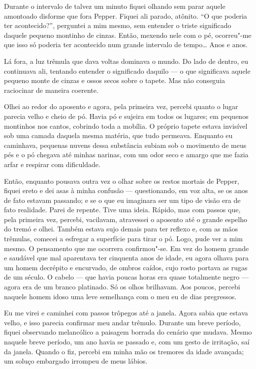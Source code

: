 Durante o intervalo de talvez um minuto fiquei olhando sem parar aquele amontoado disforme que fora Pepper. Fiquei ali
parado, atônito. ``O que poderia ter acontecido?'', perguntei a mim mesmo, sem entender o triste significado daquele
pequeno montinho de cinzas. Então, mexendo nele com o pé, ocorreu"-me que isso só poderia ter acontecido num grande
intervalo de tempo\ldots{} Anos e anos. 

Lá fora, a luz trêmula que dava voltas dominava o mundo. Do lado de dentro, eu continuava ali, tentando entender o
significado daquilo --- o que significava aquele pequeno monte de cinzas e ossos secos sobre o tapete. Mas não conseguia
raciocinar de maneira coerente.

Olhei ao redor do aposento e agora, pela primeira vez, percebi quanto o lugar parecia velho e cheio de pó. Havia pó e
sujeira em todos os lugares; em pequenos montinhos nos cantos, cobrindo toda a mobília. O próprio tapete estava
invisível sob uma camada daquela mesma matéria, que tudo permeava. Enquanto eu caminhava, pequenas nuvens dessa substância
subiam sob o movimento de meus pés e o pó chegava até minhas narinas, com um odor seco e amargo que me fazia arfar e
respirar com dificuldade.

Então, enquanto pousava outra vez o olhar sobre os restos mortais de Pepper, fiquei ereto e dei asas à minha confusão
--- questionando, em voz alta, se os anos de fato estavam passando; e se o que eu imaginara ser um tipo de visão era
de fato realidade. Parei de repente. Tive uma ideia. Rápido, mas com passos que, pela primeira vez,
percebi, vacilavam, atravessei o aposento até o grande espelho do tremó e olhei. Também estava sujo demais para ter
reflexo e, com as mãos trêmulas, comecei a esfregar a superfície para tirar o pó. Logo, pude ver a mim mesmo.
O pensamento que me ocorrera confirmou"-se. Em vez do homem grande e saudável que mal aparentava ter cinquenta anos de
idade, eu agora olhava para um homem decrépito e encurvado, de ombros caídos, cujo rosto portava as rugas de um século.
O cabelo --- que havia poucas horas era quase totalmente negro --- agora era de um branco platinado. Só os olhos brilhavam.
Aos poucos, percebi naquele homem idoso uma leve semelhança com o meu eu de dias pregressos.

Eu me virei e caminhei com passos trôpegos até a janela. Agora sabia que estava velho, e isso parecia confirmar meu
andar trêmulo. Durante um breve período, fiquei observando melancólico a paisagem borrada do cenário que mudava. Mesmo
naquele breve período, um ano havia se passado e, com um gesto de irritação, saí da janela. Quando o fiz, percebi em
minha mão os tremores da idade avançada; um soluço embargado irrompeu de meus lábios.

